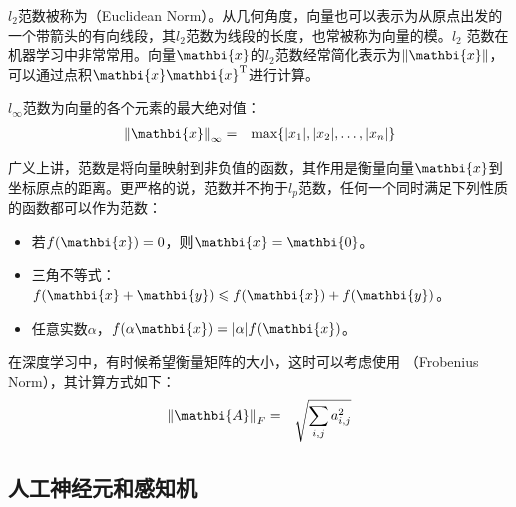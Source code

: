 \parinterval $ l_2 $范数被称为{\small{}}（Euclidean Norm）。从几何角度，向量也可以表示为从原点出发的一个带箭头的有向线段，其$ l_2 $范数为线段的长度，也常被称为向量的模。$ l_2 $ 范数在机器学习中非常常用。向量$ {\mathbi{x}} $的$ l_2 $范数经常简化表示为$ \Vert{\mathbi{x}}\Vert $，可以通过点积$ {{\mathbi{x}} \mathbi{x}}^{\textrm T} $进行计算。

\parinterval $ l_{\infty} $范数为向量的各个元素的最大绝对值：
\begin{eqnarray}
{\Vert{\mathbi{x}}\Vert}_{\infty}&=&{\textrm{max}}\{\vert x_1\vert,\vert x_2\vert,\dots,\vert x_n\vert\}
\label{eq:9-17}
\end{eqnarray}

\parinterval 广义上讲，范数是将向量映射到非负值的函数，其作用是衡量向量$ {\mathbi{x}} $到坐标原点的距离。更严格的说，范数并不拘于$ l_p $范数，任何一个同时满足下列性质的函数都可以作为范数：

\begin{itemize}
\vspace{0.5em}
\item 若$ f({\mathbi{x}})=0 $，则$ {\mathbi{x}}={\mathbi{0}} $。
\vspace{0.5em}
\item 三角不等式：$ f({\mathbi{x}}+{\mathbi{y}})\leqslant f({\mathbi{x}})+f({\mathbi{y}}) $。
\vspace{0.5em}
\item 任意实数$ \alpha $，$ f(\alpha {\mathbi{x}})=\vert \alpha \vert f({\mathbi{x}}) $。
\vspace{0.5em}
\end{itemize}

\parinterval 在深度学习中，有时候希望衡量矩阵的大小，这时可以考虑使用 {\small{}}（Frobenius Norm），其计算方式如下：
\begin{eqnarray}
{\Vert{\mathbi{A}}\Vert}_F&=&\sqrt{\sum_{i,j} a_{i,j}^2}
\label{eq:9-18}
\end{eqnarray}

\subsection{人工神经元和感知机}

